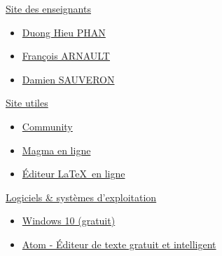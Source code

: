 \documentclass[12]{article}
\begin{document}
\begin{center}
	\underline{Site des enseignants}
\end{center}
\begin{itemize}
\item \href{http://www.unilim.fr/pages_perso/hieu.phan/symmetric.html}{Duong Hieu PHAN}
\item \href{http://www.unilim.fr/pages_perso/francois.arnault/}{François ARNAULT}
\item \href{http://damien.sauveron.fr/}{Damien SAUVERON}
\end{itemize}
\hrulefill

\begin{center}
	\underline{Site utiles}
\end{center}
\begin{itemize}
	\item \href{https://community-sciences.unilim.fr/#}{Community}
	\item \href{http://magma.maths.usyd.edu.au/calc/}{Magma en ligne}
	\item \href{https://fr.sharelatex.com/}{Éditeur \LaTeX ~en ligne}
\end{itemize}
\hrulefill
\begin{center}
	\underline{Logiciels \& systèmes d'exploitation}
\end{center}
\begin{itemize}
	\item \href{https://e5.onthehub.com/WebStore/OfferingDetails.aspx?o=a75c5c0b-2d0c-e811-80fe-000d3af41938&pmv=769faff4-d124-e511-940e-b8ca3a5db7a1&ws=92102572-856f-e011-971f-0030487d8897&vsro=8}{Windows 10 (gratuit)}
	\item \href{https://atom.io/}{Atom - Éditeur de texte gratuit et intelligent}
\end{itemize}
\end{document}
